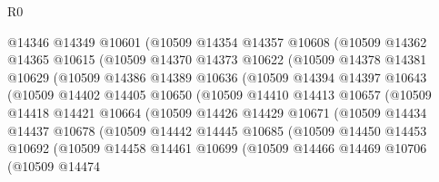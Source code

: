 \begin{lexlean}{R0}
\begin{coremodule}
                  @14346
                  @14349
                  @10601
                  (@10509
                    @14354
                    @14357
                    @10608
                    (@10509
                      @14362
                      @14365
                      @10615
                      (@10509
                        @14370
                        @14373
                        @10622
                        (@10509
                          @14378
                          @14381
                          @10629
                          (@10509
                            @14386
                            @14389
                            @10636
                            (@10509
                              @14394
                              @14397
                              @10643
                              (@10509
                                @14402
                                @14405
                                @10650
                                (@10509
                                  @14410
                                  @14413
                                  @10657
                                  (@10509
                                    @14418
                                    @14421
                                    @10664
                                    (@10509
                                      @14426
                                      @14429
                                      @10671
                                      (@10509
                                        @14434
                                        @14437
                                        @10678
                                        (@10509
                                          @14442
                                          @14445
                                          @10685
                                          (@10509
                                            @14450
                                            @14453
                                            @10692
                                            (@10509
                                              @14458
                                              @14461
                                              @10699
                                              (@10509
                                                @14466
                                                @14469
                                                @10706
                                                (@10509
                                                  @14474

\end{coremodule}
\end{lexlean}
